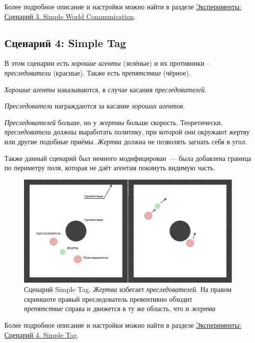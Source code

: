 Более подробное описание и настройки можно найти в разделе \hyperref[exp-swc]{Эксперименты: Сценарий 3. Simple World Communication}.

\subsection{Сценарий 4: Simple Tag} \label{intro-st}

В этом сценарии есть \textit{хорошие агенты} (зелёные) и их противники – \textit{преследователи} (красные). Также есть \textit{препятствие} (чёрное).

\textit{Хорошие агенты} наказываются, в случае касания \textit{преследователей}.

\textit{Преследователи} награждаются за касание \textit{хороших агентов}.

\textit{Преследователей} больше, но у \textit{жертвы} больше скорость. Теоретически, \textit{преследователи} должны выработать политику, при которой они окружают жертву или другие подобные приёмы. \textit{Жертва} должна не позволять загнать себя в угол.

Также данный сценарий был немного модифицирован~--- была добавлена граница по периметру поля, которая не даёт агентам покинуть видимую часть.

\begin{figure}[ht!]
    \center
    \includegraphics [scale=0.41] {my_folder/images/intro/st.png}
    \caption{Сценарий Simple Tag. \textit{Жертва} избегает \textit{преследователей}. На правом скриншоте правый преследователь превентивно обходит \textit{препятствие} справа и движется в ту же область, что и \textit{жертва}}
    \label{fig:st}
\end{figure}

Более подробное описание и настройки можно найти в разделе \hyperref[exp-st]{Эксперименты: Сценарий 4. Simple Tag}.


